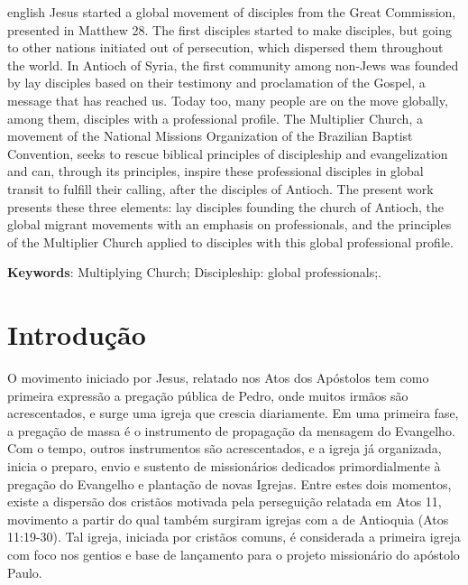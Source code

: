 \documentclass[12pt,openright,oneside,a4paper]{abntex2}
\begin{document}
\begin{resumo}[Abstract] 
\begin{otherlanguage*}{english}
	Jesus started a global movement of disciples from the Great Commission, presented in Matthew 28. The first disciples started to make disciples, but going to other nations initiated out of persecution, which dispersed them throughout the world. In Antioch of Syria, the first community among non-Jews was founded by lay disciples based on their testimony and proclamation of the Gospel, a message that has reached us. Today too, many people are on the move globally, among them, disciples with a professional profile. The Multiplier Church, a movement of the National Missions Organization of the Brazilian Baptist Convention, seeks to rescue biblical principles of discipleship and evangelization and can, through its principles, inspire these professional disciples in global transit to fulfill their calling, after the disciples of Antioch. The present work presents these three elements: lay disciples founding the church of Antioch, the global migrant movements with an emphasis on professionals, and the principles of the Multiplier Church applied to disciples with this global professional profile.

\vspace{\onelineskip} 

\noindent \textbf{Keywords}: Multiplying Church; Discipleship: global professionals;.
\end{otherlanguage*} 
\end{resumo} 


\tableofcontents* %

\textual 

\chapter{Introdução}


O movimento iniciado por Jesus, relatado nos Atos dos Apóstolos tem como primeira expressão a pregação pública de Pedro, onde muitos irmãos são acrescentados, e surge uma igreja que crescia diariamente. Em uma primeira fase, a pregação de massa é o instrumento de propagação da mensagem do Evangelho. Com o tempo, outros instrumentos são acrescentados, e a igreja já organizada, inicia o preparo, envio e sustento de missionários dedicados primordialmente à pregação do Evangelho e plantação de novas Igrejas. Entre estes dois momentos, existe a dispersão dos cristãos motivada pela perseguição relatada em Atos 11, movimento a partir do qual também surgiram igrejas com a de Antioquia (Atos 11:19-30). Tal igreja, iniciada por cristãos comuns, é considerada a primeira igreja com foco nos gentios e base de lançamento para o projeto missionário do apóstolo Paulo.
	
\end{document}
